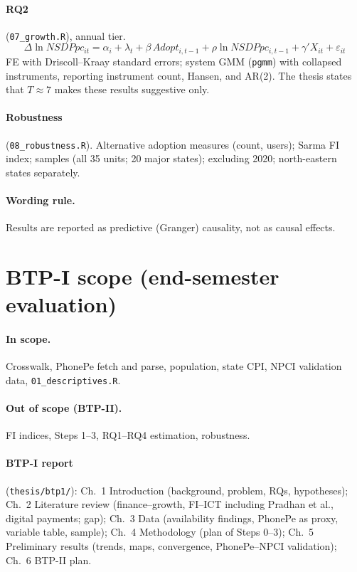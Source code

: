 \documentclass[11pt,a4paper]{article}
\begin{document}
\paragraph{RQ2} (\texttt{07\_growth.R}), annual tier.
\[
\Delta \ln NSDPpc_{it} = \alpha_i + \lambda_t + \beta\, Adopt_{i,t-1} + \rho \ln NSDPpc_{i,t-1}
  + \gamma' X_{it} + \varepsilon_{it}
\]
FE with Driscoll--Kraay standard errors; system GMM (\texttt{pgmm}) with collapsed instruments,
reporting instrument count, Hansen, and AR(2). The thesis states that $T \approx 7$ makes these
results suggestive only.

\paragraph{Robustness} (\texttt{08\_robustness.R}). Alternative adoption measures (count, users);
Sarma FI index; samples (all 35 units; 20 major states); excluding 2020; north-eastern states separately.

\paragraph{Wording rule.} Results are reported as predictive (Granger) causality, not as causal effects.

\section{BTP-I scope (end-semester evaluation)}

\paragraph{In scope.} Crosswalk, PhonePe fetch and parse, population, state CPI, NPCI validation data,
\texttt{01\_descriptives.R}.
\paragraph{Out of scope (BTP-II).} FI indices, Steps 1--3, RQ1--RQ4 estimation, robustness.

\paragraph{BTP-I report} (\texttt{thesis/btp1/}): Ch.~1 Introduction (background, problem, RQs,
hypotheses); Ch.~2 Literature review (finance--growth, FI--ICT including Pradhan et al., digital
payments; gap); Ch.~3 Data (availability findings, PhonePe as proxy, variable table, sample);
Ch.~4 Methodology (plan of Steps 0--3); Ch.~5 Preliminary results (trends, maps, convergence,
PhonePe--NPCI validation); Ch.~6 BTP-II plan.
\end{document}

